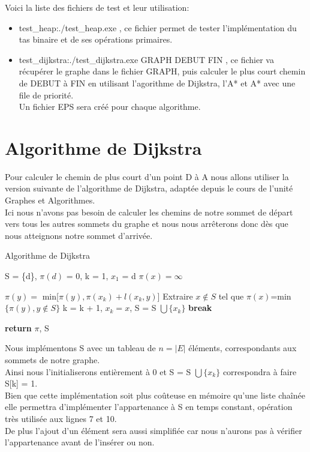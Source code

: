 \documentclass{article}
\begin{document}
Voici la liste des fichiers de test et leur utilisation:
\begin{itemize}
	\item test\_heap:./test\_heap.exe , ce fichier permet de tester l'implémentation du tas
		  binaire et de ses opérations primaires.
	\item test\_dijkstra:./test\_dijkstra.exe GRAPH DEBUT FIN , ce fichier va récupérer
		  le graphe dans le fichier GRAPH, puis calculer le plus court chemin de DEBUT à FIN
		  en utilisant l'agorithme de Dijkstra, l'A* et A* avec une file de priorité.\\
		  Un fichier EPS sera créé pour chaque algorithme.
\end{itemize}


\pagebreak
\section{Algorithme de Dijkstra}

Pour calculer le chemin de plus court d'un point D à A nous allons utiliser 
la version suivante de l'algorithme de Dijkstra, adaptée depuis le cours de 
l'unité Graphes et Algorithmes.\\

Ici nous n'avons pas besoin de calculer les chemins de notre sommet de départ
vers tous les autres sommets du graphe et nous nous arrêterons donc dès
que nous atteignons notre sommet d'arrivée.

\begin{algorithm}
\caption{Algorithme de Dijkstra}\label{dijkstra}
\begin{algorithmic}[1]
	\State S = \{d\}, $\pi(d)$ = 0, k = 1, $x_1$ = d
		\State $\pi(x) = \infty$
	\EndFor
	
			\State $\pi(y) = $ min[$\pi(y), \pi(x_k) + l(x_k, y)$]
		\EndFor
		\State Extraire $x \not\in S$ tel que $\pi(x)$=min$\{\pi(y), y \not\in S\}$
		\State k = k + 1, $x_k = x$, S = S $\bigcup \{x_k\}$
			\State \textbf{break}
		\EndIf
	\EndWhile
	
	\State \textbf{return} $\pi$, S
\EndProcedure
\end{algorithmic}
\end{algorithm}

Nous implémentons S avec un tableau de $n = \vert E\vert$ éléments, correspondants aux sommets 
de notre graphe.\\
Ainsi nous l'initialiserons entièrement à 0 et S = S $\bigcup \{x_k\}$
correspondra à faire S[k] = 1.\\
Bien que cette implémentation soit plus coûteuse en mémoire qu'une liste chaînée
elle permettra d'implémenter l'appartenance à S en temps constant, opération très
utilisée aux lignes 7 et 10.\\
De plus l'ajout d'un élément sera aussi simplifiée car nous n'aurons pas à vérifier
l'appartenance avant de l'insérer ou non.\\
\end{document}
